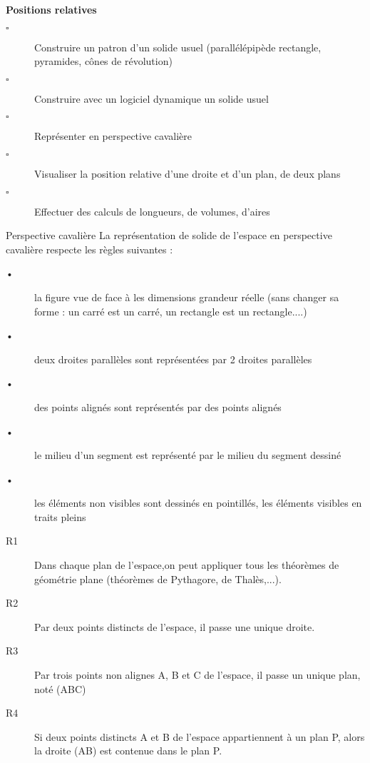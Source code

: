 \begin{titre}

\end{titre}


\begin{CpsCol}
\textbf{Positions relatives}
\begin{description}
\item[$\square$] Construire un patron d'un solide usuel (parallélépipède rectangle, pyramides, cônes de révolution)
\item[$\square$] Construire avec un logiciel dynamique un solide usuel
\item[$\square$] Représenter en perspective cavalière
\item[$\square$] Visualiser la position relative d'une droite et d'un plan, de deux plans
\item[$\square$] Effectuer des calculs de longueurs, de volumes, d'aires
\end{description}
\end{CpsCol}




\begin{DefT}{Perspective cavalière}
La représentation de solide de l'espace en perspective cavalière respecte les règles suivantes  :
\begin{description}
\item[•] la figure vue de face à les dimensions grandeur réelle (sans changer sa forme : un carré est un carré, un rectangle est un rectangle....) 
\item[•] deux droites parallèles sont représentées par 2 droites parallèles
\item[•] des points alignés sont représentés par des points alignés
\item[•] le milieu d'un segment est représenté par le milieu du segment dessiné
\item[•] les éléments non visibles sont dessinés en pointillés, les éléments visibles en traits pleins
\end{description}
\end{DefT}


\begin{Reg}[ d'incidence]
\begin{description}
\item[R1] Dans chaque plan de l'espace,on peut appliquer tous les théorèmes de géométrie plane (théorèmes de Pythagore, de Thalès,...).
\item[R2]  Par deux points distincts de l'espace, il passe une unique droite.
\item[R3]  Par trois points non alignes A, B et C de l'espace, il passe un unique plan, noté (ABC)
\item[R4]   Si deux points distincts A et B de l'espace appartiennent à un plan P, alors la droite (AB) est contenue dans le plan P.
\end{description}
\end{Reg}

